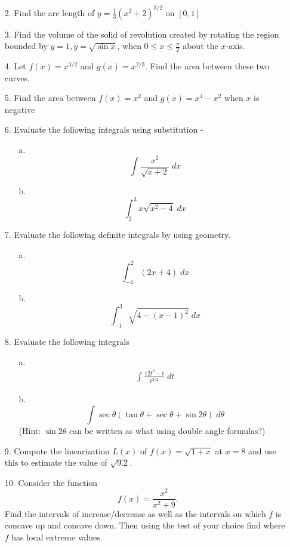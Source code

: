 \documentclass[11pt,reqno]{article}
\theoremstyle{definition}
\begin{document}
\begin{enumerate}
\begin{enumerate}
	\end{enumerate}
	\item[2.] Find the arc length of $y = \frac{1}{3}(x^2 + 2)^{3/2}$ on $[0, 1]$
	\item[3.] Find the volume of the solid of revolution created by rotating the region bounded by $y = 1, y = \sqrt{\sin x}$, when $0 \leq x \leq \frac{\pi}{2}$ about the $x$-axis.
	\item[4.]  Let  $f(x) = x^{3/2}$ and $g(x) = x^{2/3}$. Find the area between these two curves.
	\item[5.] Find the area between $f(x) = x^2$ and $g(x) = x^4 - x^2$ when $x$ is negative
	\item[6.] Evaluate the following integrals using substitution -
	\begin{enumerate}
		\item[a.] $$ \int \frac{x^2}{\sqrt{x +  2}} \; dx$$ 
		\item[b.] $$\int_{2}^{3} x\sqrt{x^2 - 4} \; dx$$
	\end{enumerate}
	\item[7.] Evaluate the following definite integrals by using geometry.
	\begin{enumerate}
		\item[a.] $$ \int_{-4}^{2} (2x + 4) \; dx$$ 
		\item[b.] $$\int_{-1}^{3} \sqrt{4 - (x - 1)^2} \; dx$$
	\end{enumerate}
	\item[8.] Evaluate the following integrals 
	\begin{enumerate}
		\item[a.] \begin{align*}
			\int \frac{12 t^8 - t}{t^{3/2}} \; dt 
		\end{align*}
		\item[b.] $$ \int \sec \theta (\tan \theta + \sec \theta + \sin 2\theta) \; d\theta$$ (Hint: $\sin 2\theta$ can be written as what using double angle formulas?)
	\end{enumerate}
	\item[9.] Compute the linearization $L(x)$ of $f(x) = \sqrt{1 + x}$ at $x = 8$ and use this to estimate the value of $\sqrt{9.2}$. 
	\item[10.] Consider the function $$f(x) = \frac{x^2}{x^2 + 9}.$$ Find the intervals of increase/decrease as well as the intervals on which $f$ is concave up and concave down. Then using the test of your choice find where $f$ has local extreme values.

\end{enumerate}
\end{document}
